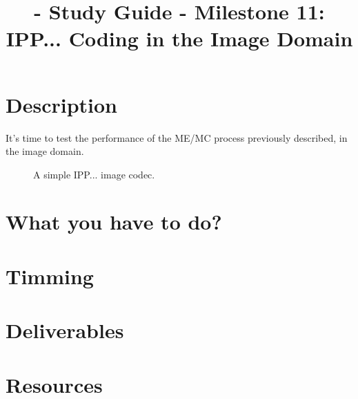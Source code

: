 
\title{\SM{} - Study Guide - Milestone 11: IPP... Coding in the Image Domain}

\maketitle

\tableofcontents

\section{Description}

It's time to test the performance of the ME/MC process previously
described, in the image domain.

\begin{figure}
  \centering
  \caption{A simple IPP... image codec.}
\label{fig:IPP}
\end{figure}

\section{What you have to do?}

\section{Timming}

\section{Deliverables}

\section{Resources}

\renewcommand{\addcontentsline}[3]{}%

